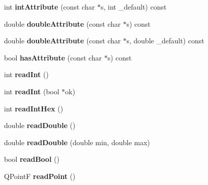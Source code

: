 \begin{DoxyCompactItemize}
int {\bfseries int\+Attribute} (const char $\ast$s, int \+\_\+default) const
\item 
\mbox{\label{class_ms_1_1_xml_reader_a737799d74d71716a8550a076ec6d4df0}} 
double {\bfseries double\+Attribute} (const char $\ast$s) const
\item 
\mbox{\label{class_ms_1_1_xml_reader_a845ff7e658cf2a452eae098eda64663f}} 
double {\bfseries double\+Attribute} (const char $\ast$s, double \+\_\+default) const
\item 
\mbox{\label{class_ms_1_1_xml_reader_a81abc42e11f1e3076f2a81a752d4c27c}} 
bool {\bfseries has\+Attribute} (const char $\ast$s) const
\item 
\mbox{\label{class_ms_1_1_xml_reader_a2fa825cb5155311203dae047b695a6ed}} 
int {\bfseries read\+Int} ()
\item 
\mbox{\label{class_ms_1_1_xml_reader_a64bdc61e768dead69c0c3ea5acb7eed0}} 
int {\bfseries read\+Int} (bool $\ast$ok)
\item 
\mbox{\label{class_ms_1_1_xml_reader_a2ea4030d29bcc90d88814be8a67dc6e7}} 
int {\bfseries read\+Int\+Hex} ()
\item 
\mbox{\label{class_ms_1_1_xml_reader_a1bd1324984256ab150f003f2682d013e}} 
double {\bfseries read\+Double} ()
\item 
\mbox{\label{class_ms_1_1_xml_reader_a631062aa99c552bad283894b3f6bd700}} 
double {\bfseries read\+Double} (double min, double max)
\item 
\mbox{\label{class_ms_1_1_xml_reader_a2ef482b8025b32d2b0adbb56f31ad171}} 
bool {\bfseries read\+Bool} ()
\item 
\mbox{\label{class_ms_1_1_xml_reader_a5fd81242cc2e818bf26112bc5fafec3a}} 
Q\+PointF {\bfseries read\+Point} ()
\item 
\mbox{\label{class_ms_1_1_xml_reader_a55f87a8fee4efbbe9bcec507b5d195f3}} 

\end{DoxyCompactItemize}
